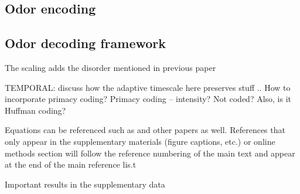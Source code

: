 \subsection{Odor encoding}

\subsection{Odor decoding framework}


The scaling adds the disorder mentioned in previous paper

TEMPORAL: discuss how the adaptive timescale here preserves stuff .. How to incorporate primacy coding?
Primacy coding -- intensity? Not coded? Also, is it Huffman coding?




Equations can be referenced such as and other papers as well. References
that only appear in the supplementary materials (figure captions, etc.) or online methods section
will follow the reference numbering of the main text and appear at the end of the main reference
lis.t

Important results in the supplementary data
